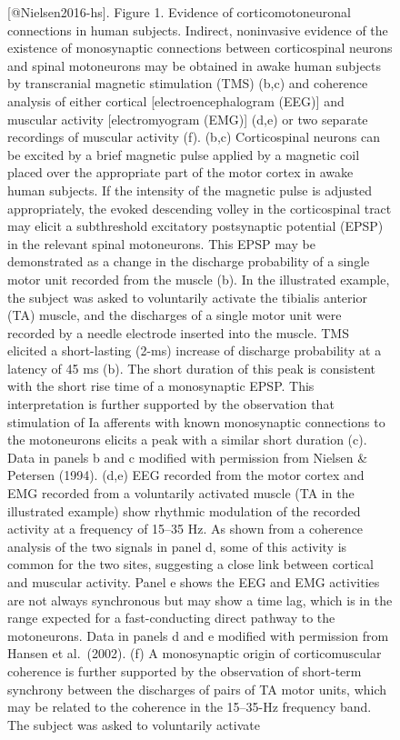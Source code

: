 \documentclass[
  letterpaper,
  DIV=11,
  numbers=noendperiod]{scrartcl}
\begin{document}
\begin{figure}[H]
\caption{{[}@Nielsen2016-hs{]}. Figure 1. Evidence of
corticomotoneuronal connections in human subjects. Indirect, noninvasive
evidence of the existence of monosynaptic connections between
corticospinal neurons and spinal motoneurons may be obtained in awake
human subjects by transcranial magnetic stimulation (TMS) (b,c) and
coherence analysis of either cortical {[}electroencephalogram (EEG){]}
and muscular activity {[}electromyogram (EMG){]} (d,e) or two separate
recordings of muscular activity (f). (b,c) Corticospinal neurons can be
excited by a brief magnetic pulse applied by a magnetic coil placed over
the appropriate part of the motor cortex in awake human subjects. If the
intensity of the magnetic pulse is adjusted appropriately, the evoked
descending volley in the corticospinal tract may elicit a subthreshold
excitatory postsynaptic potential (EPSP) in the relevant spinal
motoneurons. This EPSP may be demonstrated as a change in the discharge
probability of a single motor unit recorded from the muscle (b). In the
illustrated example, the subject was asked to voluntarily activate the
tibialis anterior (TA) muscle, and the discharges of a single motor unit
were recorded by a needle electrode inserted into the muscle. TMS
elicited a short-lasting (2-ms) increase of discharge probability at a
latency of 45 ms (b). The short duration of this peak is consistent with
the short rise time of a monosynaptic EPSP. This interpretation is
further supported by the observation that stimulation of Ia afferents
with known monosynaptic connections to the motoneurons elicits a peak
with a similar short duration (c). Data in panels b and c modified with
permission from Nielsen \& Petersen (1994). (d,e) EEG recorded from the
motor cortex and EMG recorded from a voluntarily activated muscle (TA in
the illustrated example) show rhythmic modulation of the recorded
activity at a frequency of 15--35 Hz. As shown from a coherence analysis
of the two signals in panel d, some of this activity is common for the
two sites, suggesting a close link between cortical and muscular
activity. Panel e shows the EEG and EMG activities are not always
synchronous but may show a time lag, which is in the range expected for
a fast-conducting direct pathway to the motoneurons. Data in panels d
and e modified with permission from Hansen et al.~(2002). (f) A
monosynaptic origin of corticomuscular coherence is further supported by
the observation of short-term synchrony between the discharges of pairs
of TA motor units, which may be related to the coherence in the
15--35-Hz frequency band. The subject was asked to voluntarily activate
}
\end{figure}
\end{document}
